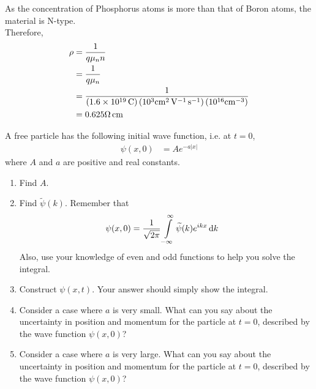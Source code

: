 \documentclass[fleqn, a4paper, 11pt, oneside]{amsart}
\theoremstyle{definition}
\theoremstyle{theorem}
\renewcommand{\tilde}{\widetilde}
\begin{document}
\begin{solution}
	As the concentration of Phosphorus atoms is more than that of Boron atoms, the material is N-type.\\
	Therefore,
	\begin{align*}
		\rho & = \frac{1}{q \mu_n n}                                                                                                                                                       \\
                     & = \frac{1}{q \mu_n}                                                                                                                                                         \\
                     & = \frac{1}{\left( 1.6 \times 10^{19} \coulomb \right) \left( 10^3 \si{\centi\metre\squared\per\volt\per\second} \right) \left( 10^{16} \si{\per\centi\metre\cubed} \right)} \\
                     & = 0.625 \si{\ohm\centi\metre}
	\end{align*}
\end{solution}

\begin{question}
	A free particle has the following initial wave function, i.e. at $t = 0$,
	\begin{align*}
		\psi(x,0) & = A e^{-a |x|}
	\end{align*}
	where $A$ and $a$ are positive and real constants.
	\begin{enumerate}
		\item
			Find $A$.
		\item
			Find $\tilde{\psi}(k)$.
			Remember that
			\begin{align*}
				\psi(x,0) & = \frac{1}{\sqrt{2 \pi}} \int\limits_{-\infty}^{\infty} \tilde{\psi}(k) e^{i k x} \dif k
			\end{align*}
			Also, use your knowledge of even and odd functions to help you solve the integral.
		\item
			Construct $\psi(x,t)$.
			Your answer should simply show the integral.
		\item
			Consider a case where $a$ is very small.
			What can you say about the uncertainty in position and momentum for the particle at $t = 0$, described by the wave function $\psi(x,0)$?
		\item
			Consider a case where $a$ is very large.
			What can you say about the uncertainty in position and momentum for the particle at $t = 0$, described by the wave function $\psi(x,0)$?
	\end{enumerate}
\end{question}
\end{document}
